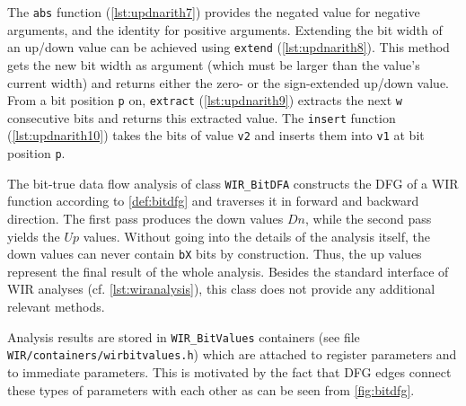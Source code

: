The \texttt{abs} function (\cref{lst:updnarith7}) provides the negated value for negative arguments, and the identity for positive arguments.
Extending the bit width of an up/down value can be achieved using \texttt{extend} (\cref{lst:updnarith8}).
This method gets the new bit width as argument (which must be larger than the value's current width) and returns either the zero- or the sign-extended up/down value.
From a bit position \texttt{p} on, \texttt{extract} (\cref{lst:updnarith9}) extracts the next \texttt{w} consecutive bits and returns this extracted value.
The \texttt{insert} function (\cref{lst:updnarith10}) takes the bits of value \texttt{v2} and inserts them into \texttt{v1} at bit position \texttt{p}.

The bit-true data flow analysis of class \texttt{WIR\_BitDFA} constructs the \gls{DFG} of a \gls{WIR} function according to \cref{def:bitdfg} and traverses it in forward and backward direction.
The first pass produces the down values $\mathit{Dn}$, while the second pass yields the $\mathit{Up}$ values.
Without going into the details of the analysis itself, the down values can never contain \texttt{bX} bits by construction.
Thus, the up values represent the final result of the whole analysis.
Besides the standard interface of \gls{WIR} analyses (cf. \cref{lst:wiranalysis}), this class does not provide any additional relevant methods.

Analysis results are stored in \texttt{WIR\_BitValues} containers (see file \texttt{WIR/containers/wirbitvalues.h}) which are attached to register parameters and to immediate parameters.
This is motivated by the fact that \gls{DFG} edges connect these types of parameters with each other as can be seen from \cref{fig:bitdfg}.\label{sec:bitinfo}

